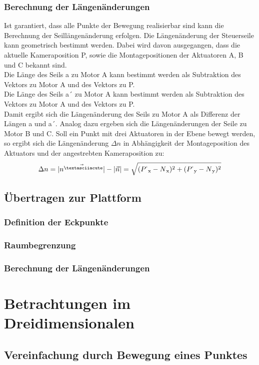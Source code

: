 \documentclass[a4paper, 12pt]{article}
\begin{document}
			\subsubsection{Berechnung der Längenänderungen}
			Ist garantiert, dass alle Punkte der Bewegung realisierbar sind kann die Berechnung der Seillängenänderung erfolgen. 
			Die Längenänderung der Steuerseile kann geometrisch bestimmt werden.
			Dabei wird davon ausgegangen, dass die aktuelle Kameraposition P, sowie die Montagepositionen der Aktuatoren A, B und C bekannt sind.\\
			Die Länge des Seils a zu Motor A kann bestimmt werden als Subtraktion des Vektors zu Motor A und des Vektors zu P.\\
			Die Länge des Seils a´ zu Motor A kann bestimmt werden als Subtraktion des Vektors zu Motor A und des Vektors zu P.\\
			Damit ergibt sich die Längenänderung des Seils zu Motor A als Differenz der Längen a und a´.
			Analog dazu ergeben sich die Längenänderungen der Seile zu Motor B und C.
			Soll ein Punkt mit drei Aktuatoren in der Ebene bewegt werden,
			so ergibt sich die Längenänderung $\Delta n$ in Abhängigkeit der Montageposition des Aktuators und der angestrebten Kameraposition zu:
			\begin{align}
				\Delta n =
				|\vec{n^{´}}|-|\vec{n}|=
				\sqrt{
				(P^{`}\textsubscript{x}-N\textsubscript{x})^2+
				(P^{`}\textsubscript{y}-N\textsubscript{y})^2
				}
			\end{align}
		\subsection{Übertragen zur Plattform}
			\subsubsection{Definition der Eckpunkte}
			\subsubsection{Raumbegrenzung}
			\subsubsection{Berechnung der Längenänderungen}
	\section{Betrachtungen im Dreidimensionalen}
			\subsection{Vereinfachung durch Bewegung eines Punktes}
\end{document}
